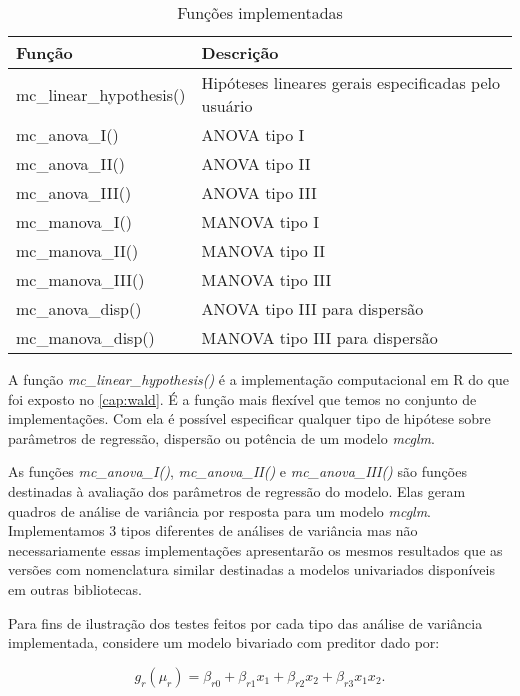 \begin{table}[h]
\centering
\begin{tabular}{ll}
\hline
Função                   & Descrição \\ 
\hline

mc\_linear\_hypothesis() & Hipóteses lineares gerais especificadas pelo usuário \\

mc\_anova\_I()           & ANOVA  tipo I \\
mc\_anova\_II()          & ANOVA  tipo II \\
mc\_anova\_III()         & ANOVA  tipo III \\

mc\_manova\_I()          & MANOVA tipo I \\
mc\_manova\_II()         & MANOVA tipo II \\
mc\_manova\_III()        & MANOVA tipo III \\

mc\_anova\_disp()        & ANOVA  tipo III para dispersão \\
mc\_manova\_disp()       & MANOVA tipo III para dispersão \\

\hline
\end{tabular}
\caption{Funções implementadas}
\label{tab:funcoes}
\end{table}

A função \emph{mc\_linear\_hypothesis()} é a implementação computacional em R do que foi exposto no \autoref{cap:wald}. É a função mais flexível que temos no conjunto de implementações. Com ela é possível especificar qualquer tipo de hipótese sobre parâmetros de regressão, dispersão ou potência de um modelo \emph{mcglm}. 

As funções \emph{mc\_anova\_I()}, \emph{mc\_anova\_II()} e \emph{mc\_anova\_III()} são funções destinadas à avaliação dos parâmetros de regressão do modelo. Elas geram quadros de análise de variância por resposta para um modelo \emph{mcglm}. Implementamos 3 tipos diferentes de análises de variância mas não necessariamente essas implementações apresentarão os mesmos resultados que as versões com nomenclatura similar destinadas a modelos univariados disponíveis em outras bibliotecas.

Para fins de ilustração dos testes feitos por cada tipo das análise de variância implementada, considere um modelo bivariado com preditor dado por:

\begin{equation}
g_r(\mu_r) = \beta_{r0} + \beta_{r1} x_1 + \beta_{r2} x_2 + \beta_{r3} x_1x_2.
\end{equation}

